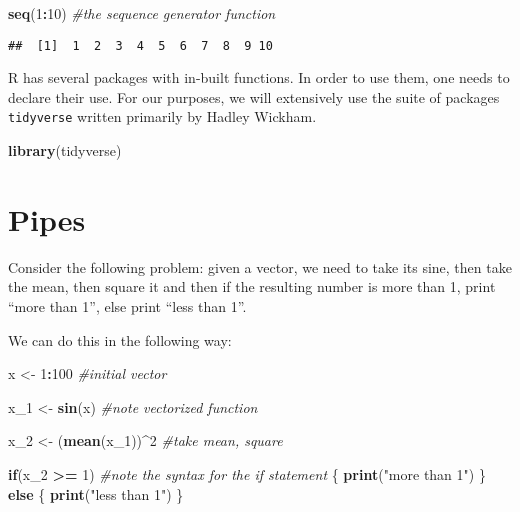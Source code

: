 \documentclass[11pt,]{article}
\newenvironment{Shaded}{\begin{snugshade}}{\end{snugshade}}
\newcommand{\KeywordTok}[1]{\textcolor[rgb]{0.13,0.29,0.53}{\textbf{#1}}}
\newcommand{\DecValTok}[1]{\textcolor[rgb]{0.00,0.00,0.81}{#1}}
\newcommand{\StringTok}[1]{\textcolor[rgb]{0.31,0.60,0.02}{#1}}
\newcommand{\CommentTok}[1]{\textcolor[rgb]{0.56,0.35,0.01}{\textit{#1}}}
\newcommand{\ControlFlowTok}[1]{\textcolor[rgb]{0.13,0.29,0.53}{\textbf{#1}}}
\newcommand{\OperatorTok}[1]{\textcolor[rgb]{0.81,0.36,0.00}{\textbf{#1}}}
\newcommand{\NormalTok}[1]{#1}
\begin{document}
\begin{Shaded}
\begin{Highlighting}[]
\KeywordTok{seq}\NormalTok{(}\DecValTok{1}\OperatorTok{:}\DecValTok{10}\NormalTok{) }\CommentTok{#the sequence generator function}
\end{Highlighting}
\end{Shaded}

\begin{verbatim}
##  [1]  1  2  3  4  5  6  7  8  9 10
\end{verbatim}

R has several packages with in-built functions. In order to use them,
one needs to declare their use. For our purposes, we will extensively
use the suite of packages \texttt{tidyverse} written primarily by Hadley
Wickham.

\begin{Shaded}
\begin{Highlighting}[]
\KeywordTok{library}\NormalTok{(tidyverse)}
\end{Highlighting}
\end{Shaded}

\section{Pipes}\label{pipes}

Consider the following problem: given a vector, we need to take its
sine, then take the mean, then square it and then if the resulting
number is more than 1, print ``more than 1'', else print ``less than
1''.

We can do this in the following way:

\begin{Shaded}
\begin{Highlighting}[]
\NormalTok{x <-}\StringTok{ }\DecValTok{1}\OperatorTok{:}\DecValTok{100} \CommentTok{#initial vector}

\NormalTok{x_}\DecValTok{1}\NormalTok{ <-}\StringTok{ }\KeywordTok{sin}\NormalTok{(x) }\CommentTok{#note vectorized function}

\NormalTok{x_}\DecValTok{2}\NormalTok{ <-}\StringTok{ }\NormalTok{(}\KeywordTok{mean}\NormalTok{(x_}\DecValTok{1}\NormalTok{))}\OperatorTok{^}\DecValTok{2} \CommentTok{#take mean, square}

\ControlFlowTok{if}\NormalTok{(x_}\DecValTok{2} \OperatorTok{>=}\StringTok{ }\DecValTok{1}\NormalTok{) }\CommentTok{#note the syntax for the if statement}
\NormalTok{\{}
  \KeywordTok{print}\NormalTok{(}\StringTok{"more than 1"}\NormalTok{)}
\NormalTok{\} }\ControlFlowTok{else}
\NormalTok{\{}
  \KeywordTok{print}\NormalTok{(}\StringTok{"less than 1"}\NormalTok{)}
\NormalTok{\}}
\end{Highlighting}
\end{Shaded}
\end{document}

